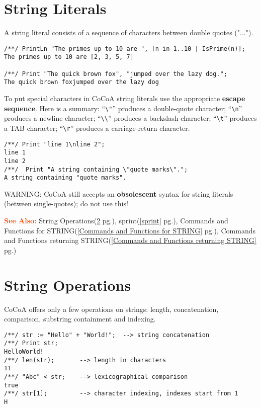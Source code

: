 \documentclass[a4paper]{mybook}
\newcommand\SeeAlso{\par\textcolor{OrangeRed}{\textbf{\large See Also: }}}
\begin{document}
\section{String Literals}
\label{String Literals}

        
A string literal consists of a sequence of characters between double
quotes ("...").
\begin{Verbatim}[label=example, rulecolor=\color{PineGreen}, frame=single]
/**/ PrintLn "The primes up to 10 are ", [n in 1..10 | IsPrime(n)];
The primes up to 10 are [2, 3, 5, 7]

/**/ Print "The quick brown fox", "jumped over the lazy dog.";
The quick brown foxjumped over the lazy dog
\end{Verbatim}


To put special characters in CoCoA string literals use the appropriate
\textbf{escape sequence}.  Here is a summary:
  ``\verb&\"&''  produces a double-quote character;
  ``\verb&\n&''  produces a newline character;
  ``\verb&\\&''  produces a backslash character;
  ``\verb&\t&''  produces a TAB character;
  ``\verb&\r&''  produces a carriage-return character.
\begin{Verbatim}[label=example, rulecolor=\color{PineGreen}, frame=single]
/**/ Print "line 1\nline 2";
line 1
line 2
/**/  Print "A string containing \"quote marks\".";
A string containing "quote marks".
\end{Verbatim}


WARNING: CoCoA still accepts an \textbf{obsolescent} syntax for string
literals (between single-quotes); do not use this!

\SeeAlso %
  String Operations(\ref{String Operations} pg.\pageref{String Operations}), 
    sprint(\ref{sprint} pg.\pageref{sprint}), 
    Commands and Functions for STRING(\ref{Commands and Functions for STRING} pg.\pageref{Commands and Functions for STRING}), 
    Commands and Functions returning STRING(\ref{Commands and Functions returning STRING} pg.\pageref{Commands and Functions returning STRING})

\section{String Operations}
\label{String Operations}

        
CoCoA offers only a few operations on strings: length, concatenation,
comparison, substring containment and indexing.
\begin{Verbatim}[label=example, rulecolor=\color{PineGreen}, frame=single]
/**/ str := "Hello" + "World!";  --> string concatenation
/**/ Print str;
HelloWorld!
/**/ len(str);       --> length in characters
11
/**/ "Abc" < str;    --> lexicographical comparison
true
/**/ str[1];         --> character indexing, indexes start from 1
H
\end{Verbatim}
\end{document}
